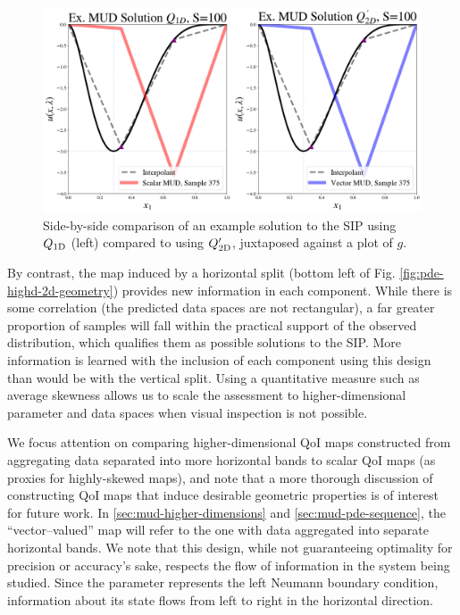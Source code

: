 \begin{figure}
  \includegraphics[width=0.95\linewidth]{figures/pde-highd/pde-highd_comp_exmud_D2_m100.png}
\caption{
Side-by-side comparison of an example solution to the SIP using $Q_\text{1D}$ (left) compared to using $Q_\text{2D}^\prime$, juxtaposed against a plot of $g$.
}
\label{fig:pde-highd-2d-scalar-vs-alt}
\end{figure}

By contrast, the map induced by a horizontal split (bottom left of Fig. \ref{fig:pde-highd-2d-geometry}) provides new information in each component.
While there is some correlation (the predicted data spaces are not rectangular), a far greater proportion of samples will fall within the practical support of the observed distribution, which qualifies them as possible solutions to the SIP.
More information is learned with the inclusion of each component using this design than would be with the vertical split.
Using a quantitative measure such as average skewness allows us to scale the assessment to higher-dimensional parameter and data spaces when visual inspection is not possible.

We focus attention on comparing higher-dimensional QoI maps constructed from aggregating data separated into more horizontal bands to scalar QoI maps (as proxies for highly-skewed maps), and note that a more thorough discussion of constructing QoI maps that induce desirable geometric properties is of interest for future work.
In \ref{sec:mud-higher-dimensions} and \ref{sec:mud-pde-sequence}, the ``vector--valued'' map will refer to the one with data aggregated into separate horizontal bands.
We note that this design, while not guaranteeing optimality for precision or accuracy's sake, respects the flow of information in the system being studied.
Since the parameter represents the left Neumann boundary condition, information about its state flows from left to right in the horizontal direction.

\FloatBarrier
